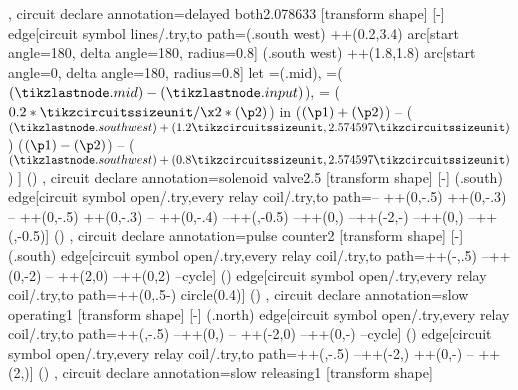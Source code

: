 {{  },
  circuit declare annotation={delayed both}{2.078633\tikzcircuitssizeunit}
  {
    [transform shape]
    [-]
    edge[circuit symbol lines/.try,to path={(\tikzlastnode.south west) ++(0.2\tikzcircuitssizeunit,3.4\tikzcircuitssizeunit) arc[start angle=180, delta angle=180, radius=0.8\tikzcircuitssizeunit] (\tikzlastnode.south west) ++(1.8\tikzcircuitssizeunit,1.8\tikzcircuitssizeunit) arc[start angle=0, delta angle=180, radius=0.8\tikzcircuitssizeunit] let =(\tikzlastnode.mid), =($(\tikzlastnode.mid) - (\tikzlastnode.input)$),  = ($0.2*\tikzcircuitssizeunit/\x2*(\p2)$) in ($(\p1)+(\p2)$) -- ($(\tikzlastnode.south west) + (1.2\tikzcircuitssizeunit,2.574597\tikzcircuitssizeunit)$) ($(\p1)-(\p2)$) -- ($(\tikzlastnode.south west) + (0.8\tikzcircuitssizeunit,2.574597\tikzcircuitssizeunit)$)} ] ()
  },
  circuit declare annotation={solenoid valve}{2.5\tikzcircuitssizeunit}
  {
    [transform shape]
    [-]
    (\tikzlastnode.south) edge[circuit symbol open/.try,every relay coil/.try,to path={-- ++(0,-.5\tikzcircuitssizeunit) ++(0,-.3\tikzcircuitssizeunit) -- ++(0,-.5\tikzcircuitssizeunit) ++(0,-.3\tikzcircuitssizeunit) -- ++(0,-.4\tikzcircuitssizeunit) --++(\tikzcircuitssizeunit,-0.5\tikzcircuitssizeunit)  --++(0,\tikzcircuitssizeunit) --++(-2\tikzcircuitssizeunit,-\tikzcircuitssizeunit)  --++(0,\tikzcircuitssizeunit) --++(\tikzcircuitssizeunit,-0.5\tikzcircuitssizeunit)}] ()
  },
  circuit declare annotation={pulse counter}{2\tikzcircuitssizeunit}
  {
    [transform shape]
    [-]
    (\tikzlastnode.south) edge[circuit symbol open/.try,every relay coil/.try,to path={++(-\tikzcircuitssizeunit,.5\pgflinewidth) --++(0,-2\tikzcircuitssizeunit) -- ++(2\tikzcircuitssizeunit,0) --++(0,2\tikzcircuitssizeunit) --cycle}] () edge[circuit symbol open/.try,every relay coil/.try,to path={++(0,.5\pgflinewidth-\tikzcircuitssizeunit)  circle(0.4\tikzcircuitssizeunit)}] ()
  },
  circuit declare annotation={slow operating}{1\tikzcircuitssizeunit}
  {
    [transform shape]
    [-]
    (\tikzlastnode.north) edge[circuit symbol open/.try,every relay coil/.try,to path={++(\tikzcircuitssizeunit,-.5\pgflinewidth) --++(0,\tikzcircuitssizeunit) -- ++(-2\tikzcircuitssizeunit,0) --++(0,-\tikzcircuitssizeunit) --cycle}] () edge[circuit symbol open/.try,every relay coil/.try,to path={++(\tikzcircuitssizeunit,-.5\pgflinewidth) --++(-2\tikzcircuitssizeunit,\tikzcircuitssizeunit) ++(0,-\tikzcircuitssizeunit) -- ++(2\tikzcircuitssizeunit,\tikzcircuitssizeunit)}] ()
  },
  circuit declare annotation={slow releasing}{1\tikzcircuitssizeunit}
  {
    [transform shape]
}}

